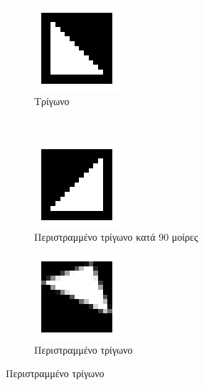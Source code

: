 \begin{figure}
        \centering
        \begin{subfigure}[t]{0.3\textwidth}
                \centerline{\includegraphics[scale = 0.5]{./images/examples/trigwno.png}}
                \caption{Τρίγωνο}
        \end{subfigure}%
        ~
        \centering
        \begin{subfigure}[t]{0.3\textwidth}
                \centerline{\includegraphics[scale = 0.5]{./images/examples/trigwno90.png}}
                \caption{Περιστραμμένο τρίγωνο κατά 90 μοίρες}
        \end{subfigure}%
        \centering
        \begin{subfigure}[t]{0.3\textwidth}
                \centerline{\includegraphics[scale = 0.5]{./images/examples/Rotatedtrigwno.png}}
                \caption{Περιστραμμένο τρίγωνο}
        \end{subfigure}%


\end{figure}
